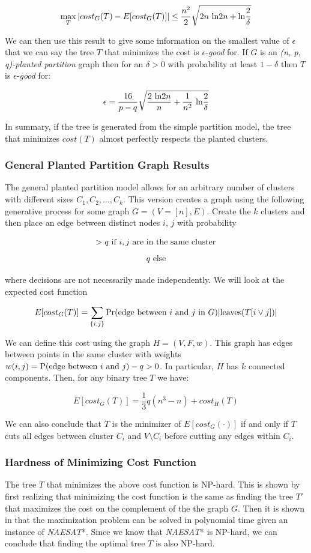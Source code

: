$$\max_T|cost_G(T) - E[cost_G(T)]| \leq \frac{n^2}{2} \sqrt{2n\hbox{ ln}2n + \hbox{ln} \frac{2}{\delta}}$$

We can then use this result to give some information on the smallest value of $\epsilon$ that we can say the tree $T$ that minimizes the cost is $\epsilon$-\textit{good} for. If $G$ is an \textit{(n, p, q)-planted partition} graph then for an $\delta > 0$ with probability at least $1 - \delta$ then $T$ is $\epsilon$-\textit{good} for:

$$\epsilon = \frac{16}{p - q}\sqrt{\frac{2 \hbox{ ln} 2n}{n} + \frac{1}{n^2}\hbox{ ln}\frac{2}{\delta}}$$

In summary, if the tree is generated from the simple partition model, the tree that minimizes $cost(T)$ almost perfectly respects the planted clusters. 

\subsubsection{General Planted Partition Graph Results}

The general planted partition model allows for an arbitrary number of clusters with different sizes $C_1, C_2, ..., C_k$. This version creates a graph using the following generative process for some graph $G = (V = [n], E)$. Create the $k$ clusters and then place an edge between distinct nodes $i$, $j$ with probability

$$ > q \hbox{ if } i, j \hbox{ are in the same cluster}$$
$$q \hbox{ else}$$

where decisions are not necessarily made independently. We will look at the expected cost function 

$$E[cost_G(T)] = \sum_{\{i, j\}} \hbox{Pr(edge between }  i \hbox{ and } j \hbox{ in } G)  |\hbox{leaves}(T[i \vee j])|$$

We can define this cost using the graph $H = (V, F, w)$. This graph has edges between points in the same cluster with weights $w(i, j) = \hbox{P(edge between }i\hbox{ and }j) - q > 0$. In particular, $H$ has $k$ connected components. Then, for any binary tree $T$ we have:

$$E[cost_G(T)] = \frac{1}{3} q (n^3 - n) + cost_H(T)$$

We can also conclude that $T$ is the minimizer of $E[cost_G(\cdot)]$ if and only if $T$ cuts all edges between cluster $C_i$ and $V \setminus C_i$ before cutting any edges within $C_i$.

\subsubsection{Hardness of Minimizing Cost Function}
The tree $T$ that minimizes the above cost function is NP-hard. This is shown by first realizing that minimizing the cost function is the same as finding the tree $T'$ that maximizes the cost on the complement of the the graph $G$. Then it is shown in \cite{das2016} that the maximization problem can be solved in polynomial time given an instance of \textit{NAESAT}*. Since we know that \textit{NAESAT}* is NP-hard, we can conclude that finding the optimal tree $T$ is also NP-hard. 


